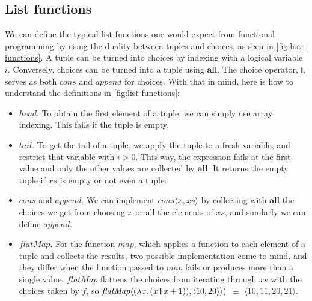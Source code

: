 \documentclass[acmsmall,review,dvipsnames]{acmart}
\newcommand{\Varid}[1]{\mathit{#1}}
\begin{document}
\subsection{List functions}

We can define the typical list functions one would expect from functional programming
by using the duality between tuples and choices, as seen in \cref{fig:list-functions}.
A tuple can be turned into choices by indexing with a logical variable \ensuremath{\Varid{i}}.
Conversely, choices can be turned into a tuple using \ensuremath{\textbf{all}}.
The choice operator, \ensuremath{\rule[-0.3mm]{0.5mm}{2.5mm}}, serves as both \ensuremath{\Varid{cons}} and \ensuremath{\Varid{append}} for choices.
With that in mind, here is how to understand
the definitions in \cref{fig:list-functions}:
\begin{itemize}
\item \ensuremath{\Varid{head}}.
To obtain the first element of a tuple, we can simply use array indexing. This fails if the tuple is empty.

\item \ensuremath{\Varid{tail}}.
To get the tail of a tuple, we apply the tuple to a fresh variable, and restrict that variable with \ensuremath{\Varid{i}\mathbin{>}\mathrm{0}}.
This way, the expression fails at the first value and only the other values are collected by \ensuremath{\textbf{all}}.
It returns the empty tuple if \ensuremath{ xs } is empty or not even a tuple.

\item \ensuremath{\Varid{cons}} and \ensuremath{\Varid{append}}.
We can implement \ensuremath{\Varid{cons}\langle\Varid{x}, xs \rangle} by collecting with \ensuremath{\textbf{all}} the choices we get from choosing \ensuremath{\Varid{x}}
or all the elements of \ensuremath{ xs }, and similarly we can define \ensuremath{\Varid{append}}.

\item \ensuremath{\Varid{flatMap}}.
For the function \ensuremath{\Varid{map}}, which applies a function to each element of a tuple and collects the results,
two possible implementation come to mind, and they differ when the function passed to \ensuremath{\Varid{map}} fails or produces more than a single value.
\ensuremath{\Varid{flatMap}} flattens the choices from iterating through \ensuremath{ xs } with
the choices taken by \ensuremath{\Varid{f}}, so \ensuremath{\Varid{flatMap}\langle(\lambda\Varid{x}.\,(\Varid{x}\;\rule[-0.3mm]{0.5mm}{2.5mm}\;\Varid{x}\mathbin{+}\mathrm{1})),\langle{}\mathrm{10},\mathrm{20}\rangle\rangle)} $\equiv$ \ensuremath{\langle{}\mathrm{10},\mathrm{11},\mathrm{20},\mathrm{21}\rangle}.


\end{itemize}
\end{document}
